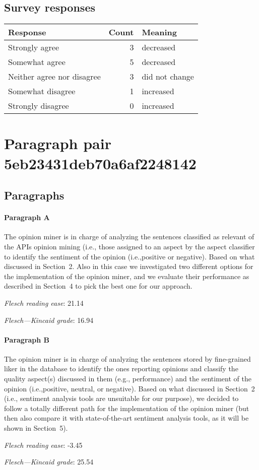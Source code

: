 \subsection{Survey responses}
\begin{tabular}{lrl}
\toprule
          \textbf{Response} &  \textbf{Count} & \textbf{Meaning} \\
\midrule
             Strongly agree &               3 &        decreased \\
             Somewhat agree &               5 &        decreased \\
 Neither agree nor disagree &               3 &   did not change \\
          Somewhat disagree &               1 &        increased \\
          Strongly disagree &               0 &        increased \\
\bottomrule
\end{tabular}

\section{Paragraph pair 5eb23431deb70a6af2248142}
\subsection{Paragraphs}
\paragraph{Paragraph A}
The opinion miner is in charge of analyzing the sentences classified as relevant of the APIs opinion mining (i.e., those assigned to an aspect by the aspect classifier to identify the sentiment of the opinion (i.e.,positive or negative). Based on what discussed in Section 2. Also in this case we investigated two different options for the implementation of the opinion miner, and we evaluate their performance as described in Section 4 to pick the best one for our approach.\par\medskip
\emph{Flesch reading ease}: 21.14\par
\emph{Flesch---Kincaid grade}: 16.94

\paragraph{Paragraph B}
The opinion miner is in charge of analyzing the sentences stored by fine-grained liker in the database to identify the ones reporting opinions and classify the quality aspect(s) discussed in them (e.g., performance) and the sentiment of the opinion (i.e.,positive, neutral, or negative). Based on what discussed in Section 2 (i.e., sentiment analysis tools are unsuitable for our purpose), we decided to follow a totally different path for the implementation of the opinion miner (but then also compare it with state-of-the-art sentiment analysis tools, as it will be shown in Section 5).\par\medskip
\emph{Flesch reading ease}: -3.45\par
\emph{Flesch---Kincaid grade}: 25.54

